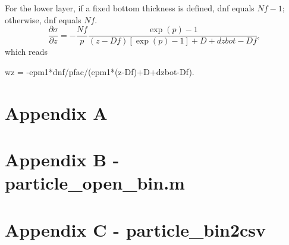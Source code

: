 \documentclass[12pt,letterpaper,titlepage]{article}
\begin{document}
For the lower layer, if a fixed bottom thickness is defined, dnf equals $Nf-1$; otherwise, dnf equals $Nf$.
\begin{equation}
\frac{\partial \sigma}{\partial z} =-\frac{Nf}{p}\frac{\exp(p)-1}{(z-Df)[\exp(p)-1]+D+dzbot-Df},
\end{equation}
which reads
\begin{center}
wz = -epm1*dnf/pfac/(epm1*(z-Df)+D+dzbot-Df).
\end{center}


\pagebreak
\appendix
%

\section{Appendix A}
\label{app: particle_sinking}


\section{Appendix B - particle\_open\_bin.m}
\label{app: particle_open_bin}

\pagebreak

\section{Appendix C - particle\_bin2csv}
\label{app: particle_bin2csv}


\pagebreak
\glsaddall				%
\renewcommand*{\arraystretch}{0.3}%
\printglossaries
\end{document}
